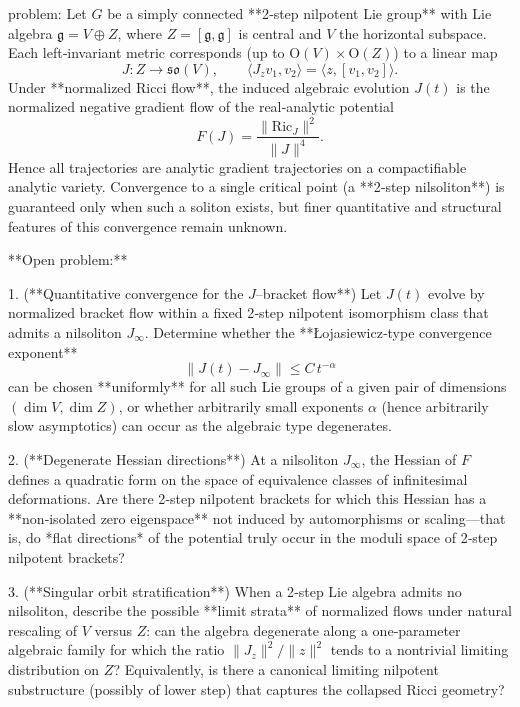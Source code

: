 problem:  
Let \(G\) be a simply connected **2‑step nilpotent Lie group** with Lie algebra \(\mathfrak{g} = V \oplus Z\), where \(Z = [\mathfrak{g},\mathfrak{g}]\) is central and \(V\) the horizontal subspace.  
Each left‑invariant metric corresponds (up to \(\mathrm{O}(V)\times\mathrm{O}(Z)\)) to a linear map  
\[
J\colon Z \to \mathfrak{so}(V), \qquad \langle J_z v_1, v_2\rangle = \langle z,[v_1,v_2]\rangle .
\]
Under **normalized Ricci flow**, the induced algebraic evolution \(J(t)\) is the normalized negative gradient flow of the real‑analytic potential  
\[
F(J)=\frac{\|\mathrm{Ric}_J\|^2}{\|J\|^4}.
\]
Hence all trajectories are analytic gradient trajectories on a compactifiable analytic variety.  Convergence to a single critical point (a **2‑step nilsoliton**) is guaranteed only when such a soliton exists, but finer quantitative and structural features of this convergence remain unknown.

**Open problem:**  

1. (**Quantitative convergence for the \(J\)–bracket flow**)  
Let \(J(t)\) evolve by normalized bracket flow within a fixed 2‑step nilpotent isomorphism class that admits a nilsoliton \(J_\infty\).  Determine whether the **Łojasiewicz‑type convergence exponent**
   \[
   \|\!J(t)-J_\infty\!\| \le C\,t^{-\alpha}
   \]
   can be chosen **uniformly** for all such Lie groups of a given pair of dimensions \((\dim V,\dim Z)\), or whether arbitrarily small exponents \(\alpha\) (hence arbitrarily slow asymptotics) can occur as the algebraic type degenerates.

2. (**Degenerate Hessian directions**)  
At a nilsoliton \(J_\infty\), the Hessian of \(F\) defines a quadratic form on the space of equivalence classes of infinitesimal deformations.  
Are there 2‑step nilpotent brackets for which this Hessian has a **non‑isolated zero eigenspace** not induced by automorphisms or scaling—that is, do *flat directions* of the potential truly occur in the moduli space of 2‑step nilpotent brackets?

3. (**Singular orbit stratification**)  
When a 2‑step Lie algebra admits no nilsoliton, describe the possible **limit strata** of normalized flows under natural rescaling of \(V\) versus \(Z\):  
can the algebra degenerate along a one‑parameter algebraic family for which the ratio \(\|J_z\|^2/\|z\|^2\) tends to a nontrivial limiting distribution on \(Z\)?  
Equivalently, is there a canonical limiting nilpotent substructure (possibly of lower step) that captures the collapsed Ricci geometry?

